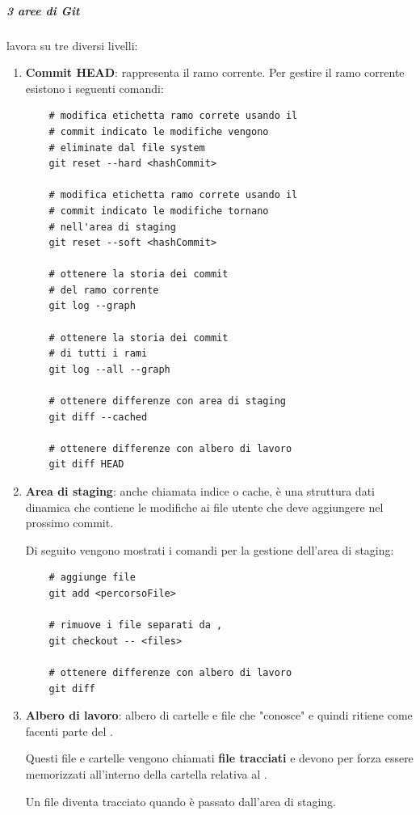\subparagraph{3 aree di Git}
\label{subpar:3_aree_git}
 lavora su tre diversi livelli:
\begin{enumerate}
    \item \textbf{Commit HEAD}: rappresenta il ramo corrente.
    Per gestire il ramo corrente esistono i seguenti comandi:
    \begin{lstlisting}
    # modifica etichetta ramo correte usando il
    # commit indicato le modifiche vengono 
    # eliminate dal file system
    git reset --hard <hashCommit>

    # modifica etichetta ramo correte usando il
    # commit indicato le modifiche tornano 
    # nell'area di staging 
    git reset --soft <hashCommit>

    # ottenere la storia dei commit 
    # del ramo corrente
    git log --graph
    
    # ottenere la storia dei commit 
    # di tutti i rami
    git log --all --graph

    # ottenere differenze con area di staging
    git diff --cached
    
    # ottenere differenze con albero di lavoro
    git diff HEAD
    \end{lstlisting}
    
    \item \textbf{Area di staging}: anche chiamata indice o cache, è una struttura dati dinamica che contiene le modifiche ai file utente che  deve aggiungere nel prossimo commit.
    
    Di seguito vengono mostrati i comandi per la gestione dell'area di staging:
    \begin{lstlisting}
    # aggiunge file
    git add <percorsoFile>

    # rimuove i file separati da ,
    git checkout -- <files>

    # ottenere differenze con albero di lavoro
    git diff 
    \end{lstlisting}
    
    \item \textbf{Albero di lavoro}: albero di cartelle e file che  "conosce" e quindi ritiene come facenti parte del .
    
    Questi file e cartelle vengono chiamati \textbf{file tracciati} e devono per forza essere memorizzati all'interno della cartella relativa al .

    Un file diventa tracciato quando è passato dall'area di staging.
\end{enumerate}


